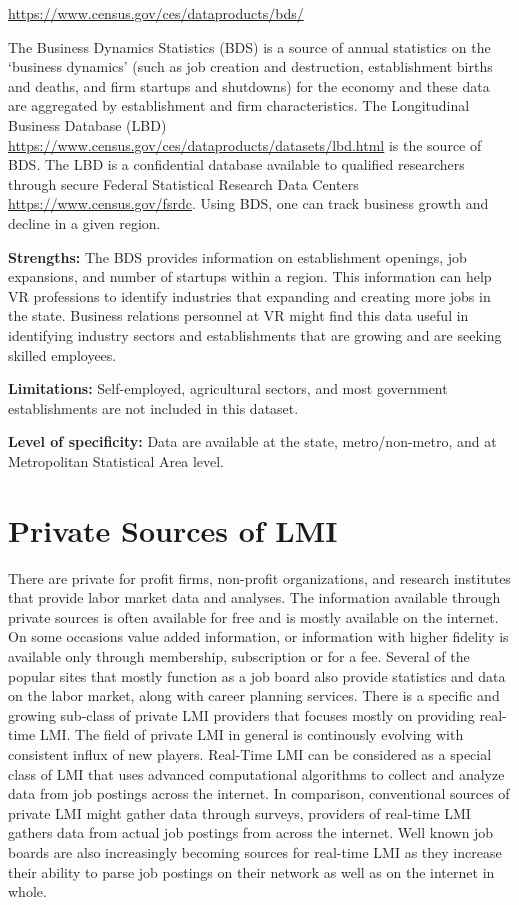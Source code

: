 \documentclass[]{book}
\theoremstyle{definition}
\theoremstyle{definition}
\theoremstyle{definition}
\theoremstyle{remark}
\begin{document}
\url{https://www.census.gov/ces/dataproducts/bds/}

The Business Dynamics Statistics (BDS) is a source of annual statistics
on the `business dynamics' (such as job creation and destruction,
establishment births and deaths, and firm startups and shutdowns) for
the economy and these data are aggregated by establishment and firm
characteristics. The Longitudinal Business Database (LBD)
\url{https://www.census.gov/ces/dataproducts/datasets/lbd.html} is the
source of BDS. The LBD is a confidential database available to qualified
researchers through secure Federal Statistical Research Data Centers
\url{https://www.census.gov/fsrdc}. Using BDS, one can track business
growth and decline in a given region.

\textbf{Strengths:} The BDS provides information on establishment
openings, job expansions, and number of startups within a region. This
information can help VR professions to identify industries that
expanding and creating more jobs in the state. Business relations
personnel at VR might find this data useful in identifying industry
sectors and establishments that are growing and are seeking skilled
employees.

\textbf{Limitations:} Self-employed, agricultural sectors, and most
government establishments are not included in this dataset.

\textbf{Level of specificity:} Data are available at the state,
metro/non-metro, and at Metropolitan Statistical Area level.

\chapter{Private Sources of LMI}\label{private-sources-of-lmi}

There are private for profit firms, non-profit organizations, and
research institutes that provide labor market data and analyses. The
information available through private sources is often available for
free and is mostly available on the internet. On some occasions value
added information, or information with higher fidelity is available only
through membership, subscription or for a fee. Several of the popular
sites that mostly function as a job board also provide statistics and
data on the labor market, along with career planning services. There is
a specific and growing sub-class of private LMI providers that focuses
mostly on providing real-time LMI. The field of private LMI in general
is continously evolving with consistent influx of new players. Real-Time
LMI can be considered as a special class of LMI that uses advanced
computational algorithms to collect and analyze data from job postings
across the internet. In comparison, conventional sources of private LMI
might gather data through surveys, providers of real-time LMI gathers
data from actual job postings from across the internet. Well known job
boards are also increasingly becoming sources for real-time LMI as they
increase their ability to parse job postings on their network as well as
on the internet in whole.
\end{document}
